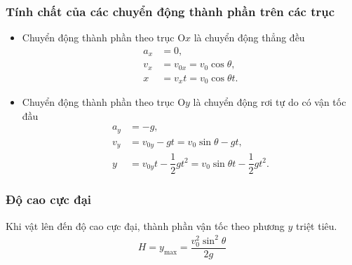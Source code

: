 \begin{center}
		
\end{center}



\subsubsection{Tính chất của các chuyển động thành phần trên các trục}
	\begin{itemize}
		\item Chuyển động thành phần theo trục O$x$ là chuyển động thẳng đều 
			\begin{align*}
				a_x&=0,\\
				v_x&=v_{0x}=v_0\cos\theta,\\
				x&=v_xt=v_0\cos\theta t.
			\end{align*}
		\item Chuyển động thành phần theo trục O$y$ là chuyển động rơi tự do có vận tốc đầu
			\begin{align}
				a_y&=-g,\\
				v_y&=v_{0y}-gt=v_0\sin\theta-gt,\\
				y&=v_{0y}t-\dfrac{1}{2}gt^{2}=v_0\sin\theta t-\dfrac{1}{2}gt^{2}.
			\end{align}
	\end{itemize} 
\subsubsection{Độ cao cực đại}
	Khi vật lên đến độ cao cực đại, thành phần vận tốc theo phương $y$ triệt tiêu. 
		\begin{align*}
			H=y_{\max}=\dfrac{v_0^2\sin^2\theta}{2g}
		\end{align*}
	
